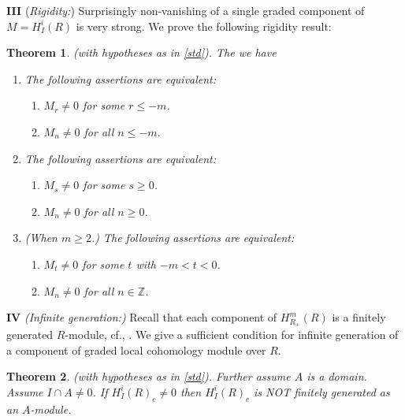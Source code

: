 \documentclass{amsart}
\newcommand{\ZZ}{\mathbb{Z} }
\theoremstyle{plain}
\newtheorem{theorem}{Theorem}[section]
\theoremstyle{definition}
\theoremstyle{remark}
\begin{document}
\textbf{III} (\textit{Rigidity:})  Surprisingly  non-vanishing of a single  graded component of $M = H^i_I(R)$ is 
very strong. We prove the following rigidity result:
\begin{theorem}\label{rigid}
(with hypotheses as in \ref{std}).  The we have
\begin{enumerate}[\rm (a)]
\item
The following assertions are equivalent:
\begin{enumerate}[\rm(i)]
\item
$M_r \neq 0$ for  some $r \leq -m$.
\item
$M_n \neq 0$ for all $n \leq -m$.
\end{enumerate}
\item
The following assertions are equivalent:
\begin{enumerate}[\rm(i)]
\item
$M_s \neq 0$ for some $s \geq 0$.
\item
$M_n \neq 0$ for all $n \geq 0$.
\end{enumerate}
\item
(When $m \geq 2$.) 
The following assertions are equivalent:
\begin{enumerate}[\rm(i)]
\item
$M_t \neq 0$ for some $t$ with $-m < t < 0$.
\item
$M_n \neq 0$ for all $n \in \ZZ$.
\end{enumerate}
\end{enumerate}
\end{theorem}

\textbf{IV} \textit{(Infinite generation:)} Recall that each component of $H^m_{R_+}(R)$ is a finitely generated $R$-module, cf., \cite[15.1.5]{BS}. We give a sufficient condition for infinite generation of a component of graded local cohomology module over $R$.
\begin{theorem}\label{inf-gen}(with hypotheses as in \ref{std}). Further assume $A$ is a domain. Assume $I \cap A \neq 0$. If $H^i_I(R)_c \neq 0$ then
$H^i_I(R)_c$ is NOT finitely generated as an $A$-module.
\end{theorem}
\end{document}
